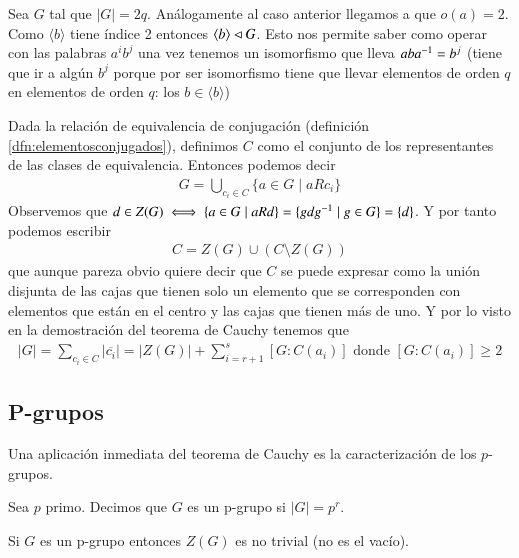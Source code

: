 \begin{ej}
	Sea $G$ tal que $|G| = 2q$. Análogamente al caso anterior llegamos a que $o(a) = 2$. Como $\langle b \rangle$ tiene índice 2 entonces $\langle b \rangle \lhd G$. Esto nos permite saber como operar con las palabras $a^ib^j$ una vez tenemos un isomorfismo que lleva $a b a^{-1} = b^j$ (tiene que ir a algún $b^j$ porque por ser isomorfismo tiene que llevar elementos de orden $q$ en elementos de orden $q$: los $b \in \langle b \rangle$)
\end{ej}

Dada la relación de equivalencia de conjugación (definición \ref{dfn:elementosconjugados}), definimos $C$ como el conjunto de los representantes de las clases de equivalencia. Entonces podemos decir
\begin{align*}
G = \bigcup_{c_i \in C} \{a \in G \mid a R c_i\}
\end{align*}
Observemos que $d \in Z(G) \iff \{a \in G \mid a R d\} = \{gdg^{-1} \mid g \in G\} = \{d\}$. Y por tanto podemos escribir
\begin{align*}
C = Z(G) \cup (C\setminus Z(G))
\end{align*}
que aunque pareza obvio quiere decir que $C$ se puede expresar como la unión disjunta de las cajas que tienen solo un elemento que se corresponden con elementos que están en el centro y las cajas que tienen más de uno. Y por lo visto en la demostración del teorema de Cauchy tenemos que
\begin{align*}
|G| = \sum_{c_i \in C} | \overline{c_i} | = |Z(G)| + \sum_{i = r + 1}^{s} [G : C(a_i)] \text{ donde } [G : C(a_i)] \geq 2
\end{align*}

\subsection{P-grupos}

Una aplicación inmediata del teorema de Cauchy es la caracterización de los $p$-grupos.

\begin{dfn}[P-grupo]
	Sea $p$ primo. Decimos que $G$ es un p-grupo si $|G| = p^r$.
\end{dfn}

\begin{thm}
	Si $G$ es un p-grupo entonces $Z(G)$ es no trivial (no es el vacío).
\end{thm}

